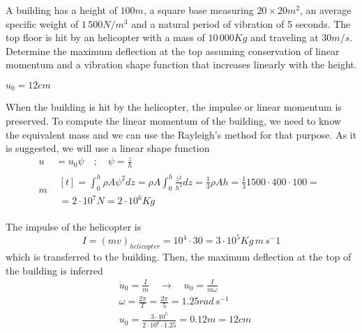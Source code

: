 
\begin{Exercise}[label={helicopter_impulse}]
A building has a height of $100m$, a square base measuring $20\times20m^2$, an average specific weight of $1\,500N/m^3$ and a natural period of vibration of 5 seconds. The top floor is hit by an helicopter with a mass of $10\,000Kg$ and traveling at $30m/s$. Determine the maximum deflection at the top assuming conservation of linear momentum and a vibration shape function that increases linearly with the height.

\begin{center}
\end{center}

\shortAnswer $u_0 = 12cm$
\end{Exercise}



\begin{Answer}[ref={helicopter_impulse}]
When the building is hit by the helicopter, the impulse or linear momentum is preserved. To compute the linear momentum of the building, we need to know the equivalent mass and we can use the Rayleigh's method for that purpose. As it is suggested, we will use a linear shape function
\begin{align*}
u& = u_0\psi \quad ; \quad \psi = \frac{z}{h} \\
m& \begin{multlined}[t]= \int_0^h \rho A\psi^2dz = \rho A\int_0^h\frac{z^2}{h^2}dz = \frac{1}{3}\rho Ah = \frac{1}{3} 1500 \cdot 400 \cdot 100 = \\
    = 2\cdot 10^7N = 2\cdot 10^6Kg \end{multlined}
\end{align*}

The impulse of the helicopter is
$$
I = (mv)_{helicopter} = 10^4 \cdot 30 = 3\cdot 10^5 Kg\,m\,s^-1
$$
which is transferred to the building. Then, the maximum deflection at the top of the building is inferred
\begin{align*}
&\dot{u}_0 = \frac{I}{m} \quad \rightarrow \quad u_0 = \frac{I}{m\omega} \\
&\omega = \frac{2\pi}{T} = \frac{2\pi}{5} = 1.25rad\,s^{-1} \\
&u_0 = \frac{3\cdot 10^5}{2\cdot 10^6\cdot 1.25} = 0.12m = 12cm
\end{align*}
\end{Answer}
